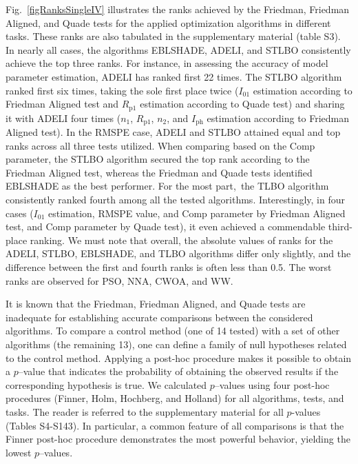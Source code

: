 \documentclass[a4paper,fleqn]{cas-sc}
\begin{document}
Fig.~\ref{figRanksSingleIV} illustrates the ranks achieved
by the Friedman, Friedman Aligned, and Quade tests for the applied optimization algorithms in different tasks.
These ranks are also tabulated in the supplementary material (table S3).
In nearly all cases, the algorithms EBLSHADE, ADELI, and STLBO consistently achieve the top three ranks.
For instance, in assessing the accuracy of model parameter estimation, ADELI has ranked first  22 times.
The STLBO algorithm ranked first six times,
taking the sole first place twice ($I_{01}$ estimation according to Friedman Aligned test and
$R_\mathrm{p1}$ estimation according to Quade test)
and sharing it with ADELI four times ($n_1$, $R_\mathrm{p1}$, $n_2$, and $I_\mathrm{ph}$
estimation according to Friedman Aligned test).
In the RMSPE  case, ADELI and STLBO attained equal and top ranks across all three tests utilized.
When comparing based on the Comp parameter,
the STLBO algorithm secured the top rank according to the Friedman Aligned test,
whereas the Friedman and Quade tests identified EBLSHADE as the best performer.
For the most part, the TLBO algorithm consistently ranked fourth among all the tested algorithms.
Interestingly, in four cases ($I_{01}$ estimation, RMSPE value, and Comp parameter by Friedman Aligned test,
and Comp parameter by Quade test),
it even achieved a commendable third-place ranking.
We must note that overall, the absolute values of ranks for the ADELI, STLBO, EBLSHADE,
and TLBO algorithms differ only slightly, and the difference between the first and fourth ranks is often less than 0.5.
The worst ranks are observed for PSO, NNA, CWOA, and WW.

It is known \cite{Derrac2011} that
the Friedman, Friedman Aligned, and Quade tests are inadequate for establishing accurate comparisons between the considered algorithms.
To compare a control method (one of 14 tested)
with a set of other algorithms (the remaining 13),
one can define a family of null hypotheses related to the control method.
Applying a post-hoc procedure makes it possible to obtain a $p$--value that indicates
the probability of obtaining the observed results if the corresponding hypothesis is true.
We calculated $p$--values using four post-hoc procedures (Finner, Holm, Hochberg, and Holland) for all algorithms, tests, and tasks.
The reader is referred to the supplementary material for all $p$-values (Tables S4-S143).
In particular, a common feature of all comparisons is that
the Finner post-hoc procedure demonstrates the most powerful behavior, yielding the lowest $p$--values.
\end{document}
